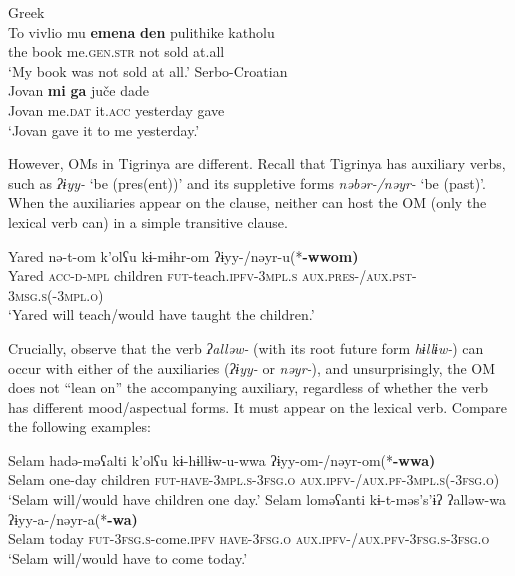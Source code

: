 \documentclass[output=paper]{langscibook}
\begin{document}
\ea\label{ex:Gebregziabher:adv} 
\ea Greek \citep[532]{giustiandstavrou08} \\
\gll To vivlio mu {\textbf{emena}} {\textbf{den}} pulithike katholu \\
the book me.{\scshape gen.str} not sold at.all\\
\glt `My book was not sold at all.'
\ex Serbo-Croatian \citep[75]{bovskovic04} \\
\gll Jovan {\textbf{mi}} {\textbf{ga}} ju\v ce dade \\
Jovan me.{\scshape dat} it.{\scshape acc} yesterday gave\\
\glt `Jovan gave it to me yesterday.'
\z
\z

\noindent However, OMs in Tigrinya are different. Recall that Tigrinya has auxiliary verbs, such as \emph{ʔɨyy-} `be (pres(ent))' and its suppletive forms \emph{nəbər-/nəyr-} `be (past)'. When the auxiliaries appear on the clause, neither can host the OM (only the lexical verb can) in a simple transitive clause.

\ea 
\gll Yared nə-t-om k'olʕu kɨ-mɨhr-om ʔɨyy-/nəyr-u(*\textbf{-wwom)} \\
Yared {\scshape acc-d-mpl} children {\scshape fut-}teach.{\scshape ipfv-3mpl.s} {\scshape aux.pres-/aux.pst-3msg.s(-3mpl.o)}\\
\glt `Yared will teach/would have taught the children.'
\z
 

\noindent Crucially, observe that the verb \emph{ʔalləw-} (with its root future form \emph{hɨllɨw-}) can occur with either of the auxiliaries (\emph{ʔɨyy-} or \emph{nəyr-}), and unsurprisingly, the OM does not ``lean on''  the accompanying auxiliary, regardless of whether the verb has different mood/aspectual forms. It must appear on the lexical verb. Compare the following examples: 


\ea\label{ex:Gebregziabher:be1} 
\gll Selam hadə-məʕalti k'olʕu kɨ-hɨllɨw-u-wwa ʔɨyy-om-/nəyr-om(*\textbf{-wwa)} \\
Selam one-day children {\scshape fut-have-3mpl.s-3fsg.o} {\scshape aux.ipfv-/aux.pf-3mpl.s(-3fsg.o)}\\
\glt `Selam will/would have children one day.'
\ex\label{ex:Gebregziabher:be2}
\gll Selam loməʕanti kɨ-t-məs's'ɨʔ ʔalləw-wa ʔɨyy-a-/nəyr-a(*\textbf{-wa)} \\
Selam today {\scshape fut-3fsg.s-}come.{\scshape ipfv} {\scshape have-3fsg.o} {\scshape aux.ipfv-/aux.pfv-3fsg.s-3fsg.o} \\
\glt `Selam will/would have to come today.'
\z
\end{document}

